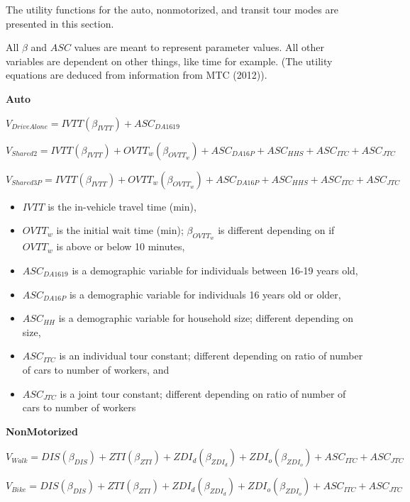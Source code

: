 \documentclass[12pt, oneside, openright]{byuthesis}
\providecommand{\tightlist}{%
  \setlength{\itemsep}{0pt}\setlength{\parskip}{0pt}}
\begin{document}
The utility functions for the auto, nonmotorized, and transit tour modes are presented in this section.

All \(\beta\) and \(ASC\) values are meant to represent parameter values. All other variables are dependent on other things, like time for example. (The utility equations are deduced from information from MTC (2012)).

\textbf{Auto}

\(V_{DriveAlone} = IVTT(\beta_{IVTT}) + ASC_{DA1619}\)

\(V_{Shared2} = IVTT(\beta_{IVTT}) + OVTT_w(\beta_{OVTT_w}) + ASC_{DA16P} + ASC_{HHS} + ASC_{ITC} + ASC_{JTC}\)

\(V_{Shared3P} = IVTT(\beta_{IVTT}) + OVTT_w(\beta_{OVTT_w}) + ASC_{DA16P} + ASC_{HHS} + ASC_{ITC} + ASC_{JTC}\)

\begin{itemize}
\tightlist
\item
  \(IVTT\) is the in-vehicle travel time (min),
\item
  \(OVTT_w\) is the initial wait time (min); \(\beta_{OVTT_w}\) is different depending on if \(OVTT_w\) is above or below 10 minutes,
\item
  \(ASC_{DA1619}\) is a demographic variable for individuals between 16-19 years old,
\item
  \(ASC_{DA16P}\) is a demographic variable for individuals 16 years old or older,
\item
  \(ASC_{HH}\) is a demographic variable for household size; different depending on size,
\item
  \(ASC_{ITC}\) is an individual tour constant; different depending on ratio of number of cars to number of workers, and
\item
  \(ASC_{JTC}\) is a joint tour constant; different depending on ratio of number of cars to number of workers
\end{itemize}

\textbf{NonMotorized}

\(V_{Walk} = DIS(\beta_{DIS}) + ZTI(\beta_{ZTI}) + ZDI_d(\beta_{ZDI_d}) + ZDI_o(\beta_{ZDI_o}) + ASC_{ITC} + ASC_{JTC}\)

\(V_{Bike} = DIS(\beta_{DIS}) + ZTI(\beta_{ZTI}) + ZDI_d(\beta_{ZDI_d}) + ZDI_o(\beta_{ZDI_o}) + ASC_{ITC} + ASC_{JTC}\)
\end{document}
